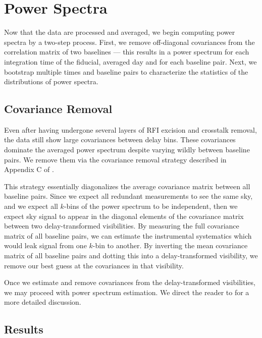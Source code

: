 \section{Power Spectra}\label{sec:results}

Now that the data are processed and averaged, we begin computing power spectra by a two-step
process. First, we remove off-diagonal covariances from the correlation matrix of two baselines ---
this results in a power spectrum for each integration time of the fiducial, averaged day and for
each baseline pair. Next, we bootstrap multiple times and baseline pairs to characterize the
statistics of the distributions of power spectra.  

\subsection{Covariance Removal}\label{sec:covariance}

Even after having undergone several layers of RFI excision and crosstalk removal, the data still
show large covariances between delay bins. These covariances dominate the averaged power spectrum
despite varying wildly between baseline pairs. We remove them via the covariance removal strategy
described in Appendix C of \citet{Parsons2014}.

This strategy essentially diagonalizes the average covariance matrix between all baseline pairs.
Since we expect all redundant measurements to see the same sky, and we expect all $k$-bins of the
power spectrum to be independent, then we expect sky signal to appear in the diagonal elements of
the covariance matrix between two delay-transformed visibilities. By measuring the full covariance 
matrix of all baseline pairs, we can estimate the instrumental systematics which would leak signal
from one $k$-bin to another. By inverting the mean covariance matrix of all baseline pairs and
dotting this into a delay-transformed visibility, we remove our best guess at the covariances in
that visibility. 

Once we estimate and remove covariances from the delay-transformed visibilities, we may proceed with
power spectrum estimation. We direct the reader to \citet{Parsons2014} for a more detailed discussion. 

\subsection{Results}

